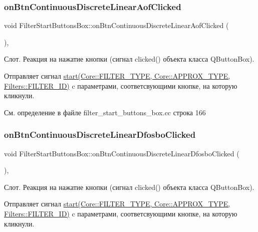\subsubsection{\texorpdfstring{on\+Btn\+Continuous\+Discrete\+Linear\+Aof\+Clicked}{onBtnContinuousDiscreteLinearAofClicked}}
{\footnotesize\ttfamily void Filter\+Start\+Buttons\+Box\+::on\+Btn\+Continuous\+Discrete\+Linear\+Aof\+Clicked (\begin{DoxyParamCaption}{ }\end{DoxyParamCaption})\hspace{0.3cm}{\ttfamily [private]}, {\ttfamily [slot]}}

Слот. Реакция на нажатие кнопки (сигнал clicked() объекта класса Q\+Button\+Box).

Отправляет сигнал \hyperlink{class_filter_start_buttons_box_ac6e2a6555f1d388391f188f834b8e753}{start(\+Core\+::\+F\+I\+L\+T\+E\+R\+\_\+\+T\+Y\+P\+E, Core\+::\+A\+P\+P\+R\+O\+X\+\_\+\+T\+Y\+P\+E, Filters\+::\+F\+I\+L\+T\+E\+R\+\_\+\+I\+D)} c параметрами, соответсвующими кнопке, на которую кликнули. 

См. определение в файле filter\+\_\+start\+\_\+buttons\+\_\+box.\+cc строка 166

\hypertarget{class_filter_start_buttons_box_a21b70f241dd25b7a84c515ca3fed37e8}{}\label{class_filter_start_buttons_box_a21b70f241dd25b7a84c515ca3fed37e8} 
\subsubsection{\texorpdfstring{on\+Btn\+Continuous\+Discrete\+Linear\+Dfosbo\+Clicked}{onBtnContinuousDiscreteLinearDfosboClicked}}
{\footnotesize\ttfamily void Filter\+Start\+Buttons\+Box\+::on\+Btn\+Continuous\+Discrete\+Linear\+Dfosbo\+Clicked (\begin{DoxyParamCaption}{ }\end{DoxyParamCaption})\hspace{0.3cm}{\ttfamily [private]}, {\ttfamily [slot]}}

Слот. Реакция на нажатие кнопки (сигнал clicked() объекта класса Q\+Button\+Box).

Отправляет сигнал \hyperlink{class_filter_start_buttons_box_ac6e2a6555f1d388391f188f834b8e753}{start(\+Core\+::\+F\+I\+L\+T\+E\+R\+\_\+\+T\+Y\+P\+E, Core\+::\+A\+P\+P\+R\+O\+X\+\_\+\+T\+Y\+P\+E, Filters\+::\+F\+I\+L\+T\+E\+R\+\_\+\+I\+D)} c параметрами, соответсвующими кнопке, на которую кликнули. 

